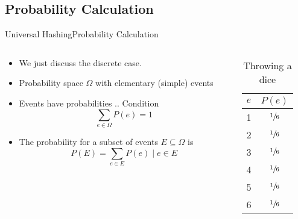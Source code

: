 \subsection{Probability Calculation}

\begin{frame}{Universal Hashing}{Probability Calculation}
  \begin{columns}
    \begin{column}{0.65\textwidth}
      \begin{itemize}
        \item<2->
          We just discuss the discrete case.
        \item<3->
          Probability space {\color{Mittel-Blau}$\Omega$} with {\color{Mittel-Blau}elementary (simple) events}
        \item<4->
          Events have probabilities .. Condition  {\color{Mittel-Blau}\[\sum_{e \in \Omega} P(e) = 1\]}
        \item<5->
          The probability for a subset of events {\color{Mittel-Blau}$E \subseteq \Omega$} is
          {\color{Mittel-Blau}\[P(E) = \sum_{e \in E} P(e) \mid e \in E\]}
      \end{itemize}
    \end{column}
    \begin{column}{0.35\textwidth}
      \begin{table}[!h]
        \caption{Throwing a dice}
        \label{tab:probabilities:rolling_dice}
        \begin{tabularx}{0.5\linewidth}{c|c}
          {\color{Mittel-Blau}$e$} & {\color{Mittel-Blau}$P(e)$}\\
          \midrule
          1 & $\sfrac{1}{6}$\\
          2 & $\sfrac{1}{6}$\\
          3 & $\sfrac{1}{6}$\\
          4 & $\sfrac{1}{6}$\\
          5 & $\sfrac{1}{6}$\\
          6 & $\sfrac{1}{6}$\\
        \end{tabularx}
      \end{table}
    \end{column}
  \end{columns}
\end{frame}


